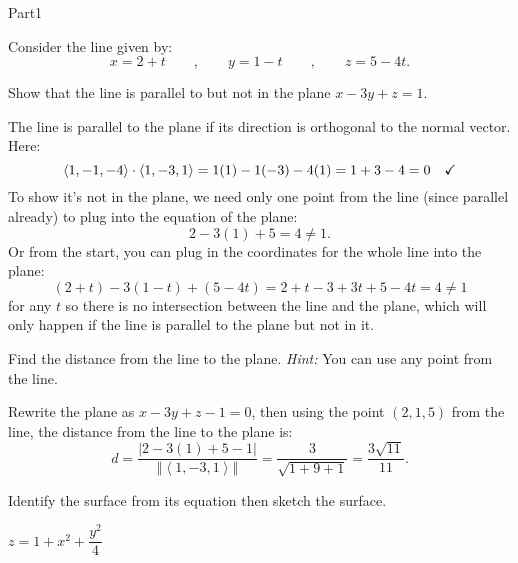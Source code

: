 \documentclass{report}
\newcommand{\norm}[1]{\left\Vert #1 \right\Vert}
\newcommand{\avec}[1]{\left\langle #1 \right\rangle}
\newcommand{\abs}[1]{\left\vert{#1}\right\vert}
\begin{document}
\begin{exam}{Part1}
\begin{problem*}[\auto] Consider the line given by:
	$$x=2+t\qquad,\qquad y=1-t\qquad,\qquad z=5-4t. $$
	\begin{parts}
		\item{} Show that the line is parallel to but not in the plane $x-3y+z=1$.
		\begin{solution}[2in] The line is parallel to the plane if its direction is orthogonal to the normal vector. Here:
		$$\avec{1,-1,-4}\cdot\avec{1,-3,1}=1(1)-1(-3)-4(1)=1+3-4=0 \quad \text{\checkmark} $$
		To show it's not in the plane, we need only one point from the line (since parallel already) to plug into the equation of the plane:
		$$2-3(1)+5=4 \ne 1. $$
		Or from the start, you can plug in the coordinates for the whole line into the plane:
		$$(2+t)-3(1-t)+(5-4t)=2+t-3+3t+5-4t=4 \ne 1 $$
		for any $t$ so there is no intersection between the line and the plane, which will only happen if the line is parallel to the plane but not in it.
		\end{solution}
		\item{} Find the distance from the line to the plane. \emph{Hint: } You can use any point from the line.
			\begin{solution}[1.25in] Rewrite the plane as $x-3y+z-1=0$, then using the point $(2,1,5)$ from the line, the distance from the line to the plane is:
			$$d=\dfrac{\abs{2-3(1)+5-1}}{\norm{\avec{1,-3,1}}}=\frac{3}{\sqrt{1+9+1}}=\boxed{\frac{3\sqrt{11}}{11}}. $$
			\end{solution}
		\end{parts}
		\end{problem*}
		
\begin{problem*}[\auto] Identify the surface from its equation then sketch the surface. 
	
	\begin{parts}
		\item{} $z=1+x^2+\dfrac{y^2}{4}\quad$ 
		\begin{solution}[1.75in]
			

\end{solution}
\end{parts}
\end{problem*}
\end{exam}
\end{document}
